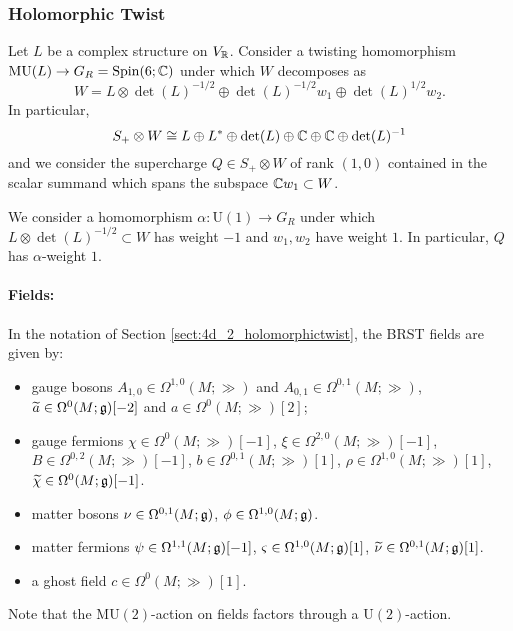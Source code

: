 \documentclass[10pt, oneside]{article}
\newcommand{\MU}{\mathrm{MU}}
\renewcommand{\U}{\mathrm{U}}
\begin{document}
\subsubsection{Holomorphic Twist}
\label{sect:4d4holomorphictwist}

Let $L$ be a complex structure on $V_\RR$. Consider a twisting homomorphism $\MU(L)\rightarrow G_R=\Spin(6; \CC)$ under which $W$ decomposes as
\[W = L\otimes \det(L)^{-1/2}\oplus \det(L)^{-1/2} w_1\oplus \det(L)^{1/2} w_2.\]
In particular,
\[S_+\otimes W\cong L\oplus L^*\oplus \det(L)\oplus \CC \oplus \CC\oplus \det(L)^{-1}\]
and we consider the supercharge $Q\in S_+\otimes W$ of rank $(1, 0)$ contained in the scalar summand which spans the subspace $\CC w_1\subset W$.

We consider a homomorphism $\alpha\colon \U(1)\rightarrow G_R$ under which $L\otimes \det(L)^{-1/2}\subset W$ has weight $-1$ and $w_1,w_2$ have weight $1$. In particular, $Q$ has $\alpha$-weight $1$.

\vspace{-10pt}
\paragraph{Fields:} In the notation of Section \ref{sect:4d_2_holomorphictwist}, the BRST fields are given by:
\begin{itemize}
\item gauge bosons $A_{1, 0}\in\Omega^{1, 0}(M; \gg)$ and $A_{0, 1}\in\Omega^{0, 1}(M; \gg)$, $\Tilde{a} \in \Omega^{0}(M; \gg)[-2]$ and $a \in\Omega^{0}(M; \gg)[2]$;
\item gauge fermions $\chi \in \Omega^0(M ; \gg)[-1]$, $\xi \in \Omega^{2,0}(M ; \gg)[-1]$, $B \in \Omega^{0,2}(M ; \gg)[-1]$, $b \in \Omega^{0,1}(M ; \gg)[1]$, $\rho \in \Omega^{1,0}(M ; \gg)[1]$,  $\Tilde{\chi} \in \Omega^0(M ; \gg)[-1]$.
\item matter bosons $\nu\in\Omega^{0, 1}(M; \fg)$, $\phi\in\Omega^{1,0}(M; \fg)$.
\item matter fermions $\psi \in \Omega^{1,1} (M;  \fg)[-1]$, $\varsigma \in \Omega^{1,0} (M ; \fg)[1]$, $\Tilde{\nu} \in \Omega^{0,1}(M; \fg)[1]$.
\item a ghost field $c\in \Omega^0(M; \gg)[1]$.
\end{itemize}

Note that the $\MU(2)$-action on fields factors through a $\U(2)$-action.
\end{document}
